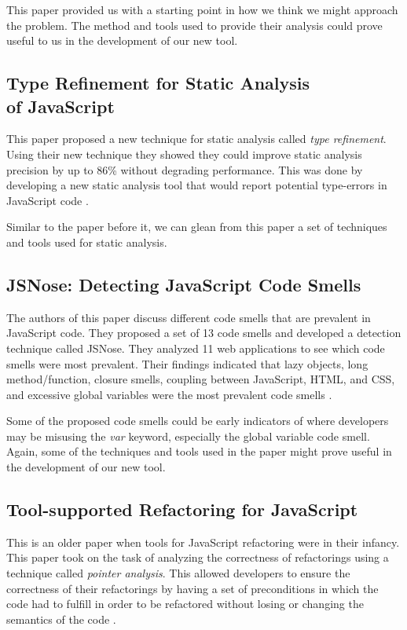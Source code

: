 \documentclass{sig-alternate}
\begin{document}
This paper provided us with a starting point in how we think we might approach the problem.
The method and tools used to provide their analysis could prove useful to us in the development of our new tool.

\subsection{Type Refinement for Static Analysis \\of JavaScript}
This paper proposed a new technique for static analysis called \textit{type refinement}.
Using their new technique they showed they could improve static analysis precision by up to 86\% without degrading performance.
This was done by developing a new static analysis tool that would report potential type-errors in JavaScript code \cite{type-refinement}.

Similar to the paper before it, we can glean from this paper a set of techniques and tools used for static analysis.

\subsection{JSNose: Detecting JavaScript Code Smells}
The authors of this paper discuss different code smells that are prevalent in JavaScript code.
They proposed a set of 13 code smells and developed a detection technique called JSNose.
They analyzed 11 web applications to see which code smells were most prevalent.
Their findings indicated that lazy objects, long method/function, closure smells, coupling between JavaScript, HTML, and CSS, and excessive global variables were the most prevalent code smells \cite{jsnose}.

Some of the proposed code smells could be early indicators of where developers may be misusing the \textit{var} keyword, especially the global variable code smell.
Again, some of the techniques and tools used in the paper might prove useful in the development of our new tool. 

\subsection{Tool-supported Refactoring for JavaScript}
This is an older paper when tools for JavaScript refactoring were in their infancy.
This paper took on the task of analyzing the correctness of refactorings using a technique called \textit{pointer analysis}.
This allowed developers to ensure the correctness of their refactorings by having a set of preconditions in which the code had to fulfill in order to be refactored without losing or changing the semantics of the code \cite{tool}.
\end{document}
